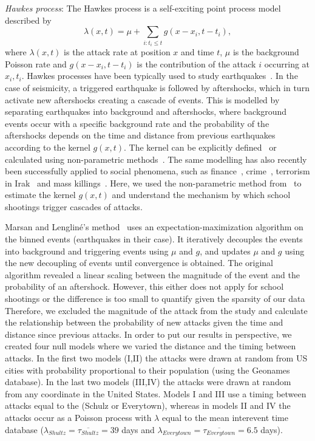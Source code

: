 \textit{Hawkes process}:
The Hawkes process is a self-exciting point process model described by
\begin{equation}
\lambda(x,t) = \mu + \sum_{i:t_i \le t}{g(x-x_i,t-t_i)},
\end{equation}\label{eq:hawkes}
where $\lambda(x,t)$ is the attack rate at position $x$ and
time $t$, $\mu$ is the background Poisson rate and $g(x-x_i,t-t_i)$ is
the contribution of the attack $i$ occurring at $x_i,t_i$. 
Hawkes processes have been typically used to study
earthquakes~\cite{ogata1988statistical}. 
In the case of seismicity, a triggered earthquake is followed by
aftershocks, which in turn activate new aftershocks creating a cascade
of events. 
This is modelled by separating earthquakes into background and
aftershocks, where background events occur with a specific background
rate and the probability of the aftershocks depends on the time and
distance from previous earthquakes according to the kernel $g(x,t)$. 
The kernel can be explicitly defined~\cite{ogata1988statistical} or
calculated using non-parametric methods~\cite{marsan2008extending}. 
The same modelling has also recently been successfully applied to
social phenomena, such as finance~\cite{hardiman2013critical},
crime~\cite{mohler2012self}, terrorism in
Irak~\cite{lewis2012self} and mass killings~\cite{towers2015a}. 
Here, we used the non-parametric method
from~\cite{marsan2008extending} to estimate the kernel $g(x,t)$ and
understand the mechanism by which school shootings trigger cascades of
attacks. 

Marsan and Lenglin{\'e}'s method~\cite{marsan2008extending} uses an
expectation-maximization algorithm on the binned events (earthquakes
in their case). 
It iteratively decouples the events into background and triggering
events using $\mu$ and $g$, and updates $\mu$ and $g$ using the new
decoupling of events until convergence is obtained. 
The original algorithm revealed a linear scaling between the magnitude
of the event and the probability of an aftershock. 
However, this either does not apply for school shootings or the
difference is too small to quantify given the sparsity of our data
Therefore, we excluded the magnitude of the attack from the study and
calculate the relationship between the probability of new attacks
given the time and distance since previous attacks. 
In order to put our results in perspective, we created four null models
where we varied the distance and the timing between attacks.
In the first two models (I,II) the attacks were drawn at random from US cities with probability
proportional to their population (using the Geonames database). 
In the last two models (III,IV) the attacks were drawn at random from any coordinate in the United States.
Models I and III use a timing between attacks equal to the (Schulz or Everytown),
whereas in models II and IV the attacks occur as a Poisson process with $\lambda$
equal to the mean interevent time database ($\lambda_{Shultz} =
\overline{\tau_{Shultz}} = 39$ days and $\lambda_{Everytown} =
\overline{\tau_{Everytown}} = 6.5$ days). 

